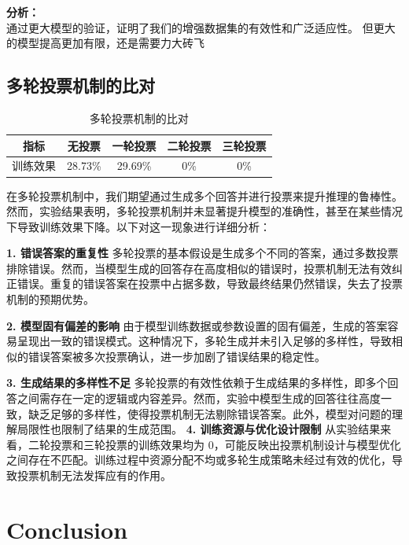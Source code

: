 \documentclass{article}
\begin{document}
\textbf{分析：}\\
通过更大模型的验证，证明了我们的增强数据集的有效性和广泛适应性。
但更大的模型提高更加有限，还是需要力大砖飞


\subsection{多轮投票机制的比对}

\begin{table}[H]
  \caption{多轮投票机制的比对}
  \label{voting-mechanism-comparison}
  \centering
  \begin{tabular}{|c|c|c|c|c|}
    \hline
    \textbf{指标} & \textbf{无投票} & \textbf{一轮投票}  & \textbf{二轮投票}& \textbf{三轮投票}\\ \hline 
    训练效果 & 28.73\% & 29.69\% & 0\%& 0\% \\ \hline
  \end{tabular}
\end{table}

在多轮投票机制中，我们期望通过生成多个回答并进行投票来提升推理的鲁棒性。然而，实验结果表明，多轮投票机制并未显著提升模型的准确性，甚至在某些情况下导致训练效果下降。以下对这一现象进行详细分析：


\textbf{1. 错误答案的重复性}
多轮投票的基本假设是生成多个不同的答案，通过多数投票排除错误。然而，当模型生成的回答存在高度相似的错误时，投票机制无法有效纠正错误。重复的错误答案在投票中占据多数，导致最终结果仍然错误，失去了投票机制的预期优势。

\textbf{2. 模型固有偏差的影响}
由于模型训练数据或参数设置的固有偏差，生成的答案容易呈现出一致的错误模式。这种情况下，多轮生成并未引入足够的多样性，导致相似的错误答案被多次投票确认，进一步加剧了错误结果的稳定性。

\textbf{3. 生成结果的多样性不足}
多轮投票的有效性依赖于生成结果的多样性，即多个回答之间需存在一定的逻辑或内容差异。然而，实验中模型生成的回答往往高度一致，缺乏足够的多样性，使得投票机制无法剔除错误答案。此外，模型对问题的理解局限性也限制了结果的生成范围。
\textbf{4. 训练资源与优化设计限制}
从实验结果来看，二轮投票和三轮投票的训练效果均为 $0$，可能反映出投票机制设计与模型优化之间存在不匹配。训练过程中资源分配不均或多轮生成策略未经过有效的优化，导致投票机制无法发挥应有的作用。






  






\section{Conclusion}
\end{document}
